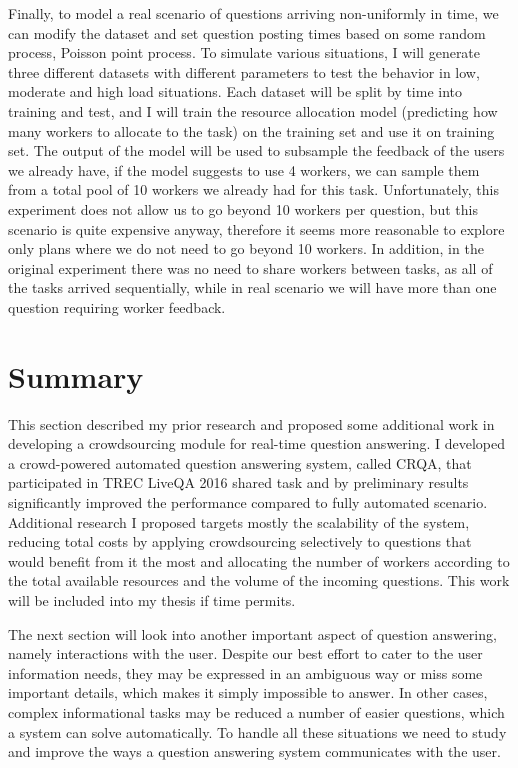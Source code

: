 Finally, to model a real scenario of questions arriving non-uniformly in time, we can modify the dataset and set question posting times based on some random process, \eg Poisson point process.
To simulate various situations, I will generate three different datasets with different parameters to test the behavior in low, moderate and high load situations.
Each dataset will be split by time into training and test, and I will train the resource allocation model (predicting how many workers to allocate to the task) on the training set and use it on training set.
The output of the model will be used to subsample the feedback of the users we already have, \eg if the model suggests to use 4 workers, we can sample them from a total pool of 10 workers we already had for this task.
Unfortunately, this experiment does not allow us to go beyond 10 workers per question, but this scenario is quite expensive anyway, therefore it seems more reasonable to explore only plans where we do not need to go beyond 10 workers.
In addition, in the original experiment there was no need to share workers between tasks, as all of the tasks arrived sequentially, while in real scenario we will have more than one question requiring worker feedback.

\section{Summary}
\label{section:crowdsourcing:summary}

This section described my prior research and proposed some additional work in developing a crowdsourcing module for real-time question answering.
I developed a crowd-powered automated question answering system, called CRQA, that participated in TREC LiveQA 2016 shared task and by preliminary results significantly improved the performance compared to fully automated scenario.
Additional research I proposed targets mostly the scalability of the system, \ie reducing total costs by applying crowdsourcing selectively to questions that would benefit from it the most and allocating the number of workers according to the total available resources and the volume of the incoming questions.
This work will be included into my thesis if time permits.

The next section will look into another important aspect of question answering, namely interactions with the user.
Despite our best effort to cater to the user information needs, they may be expressed in an ambiguous way or miss some important details, which makes it simply impossible to answer.
In other cases, complex informational tasks may be reduced a number of easier questions, which a system can solve automatically.
To handle all these situations we need to study and improve the ways a question answering system communicates with the user.
